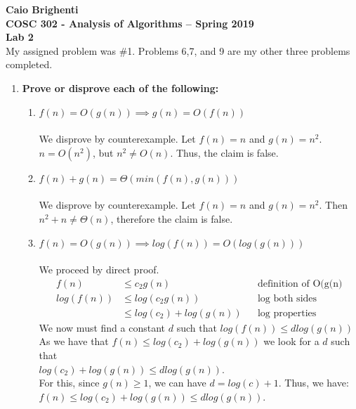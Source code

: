 \documentclass{article}
\begin{document}
\noindent \textbf{Caio Brighenti }\\
\noindent \textbf{COSC 302 - Analysis of Algorithms -- Spring 2019}\\%
\noindent \textbf{Lab 2}\vspace{1em}\\
My assigned problem was \#1. Problems 6,7, and 9 are my other three problems completed.
\begin{enumerate}
	\item \textbf{Prove or disprove each of the following:}
	\begin{enumerate}
		\item $f(n)=O(g(n)) \implies g(n)=O(f(n))$ \\
			\\ We disprove by counterexample. Let $f(n)=n$ and $g(n)=n^2$.  $n=O(n^2)$, but $n^2\neq O(n)$. Thus, the claim is false. \\
		\item $f(n)+g(n)=\Theta (min(f(n),g(n)))$ \\ 
			\\ We disprove by counterexample. Let $f(n)=n$ and $g(n)=n^2$. Then $n^2+n\neq \Theta (n)$, therefore the claim is false. \\
		\item $f(n)=O(g(n))\implies log(f(n))=O(log(g(n)))$ \\
			\\ We proceed by direct proof. 
			\begin{align}
				f(n)&\leq c_2 g(n) && \text{definition of O(g(n)} \\
				log(f(n))&\leq log(c_2 g(n)) && \text{log both sides} \\
				&\leq log(c_2)+log(g(n))&& \text{log properties} 
			\end{align}
			We now must find a constant $d$ such that 
			$log(f(n))\leq d log(g(n))$ \\
			As we have that $f(n)\leq log(c_2)+log(g(n))$ we look for a $d$ such that \\
			$log(c_2)+log(g(n))\leq dlog(g(n))$. \\
			For this, since $g(n)\geq1$, we can have $d=log(c)+1$. Thus, we have:\\
			$f(n)\leq log(c_2)+log(g(n))\leq dlog(g(n))$. \\ \\
			

\end{enumerate}
\end{enumerate}
\end{document}
